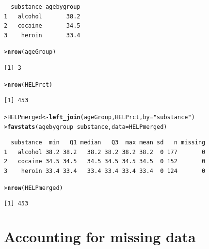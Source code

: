 \documentclass{tufte-book}\usepackage[]{graphicx}\usepackage[]{xcolor}
\makeatletter
\newcommand{\hlstr}[1]{\textcolor[rgb]{0.2,0.2,0.2}{#1}}%
\newcommand{\hlopt}[1]{\textcolor[rgb]{0.102,0.102,0.102}{#1}}%
\newcommand{\hlstd}[1]{\textcolor[rgb]{0.102,0.102,0.102}{#1}}%
\newcommand{\hlkwb}[1]{\textcolor[rgb]{0.102,0.102,0.102}{#1}}%
\newcommand{\hlkwc}[1]{\textcolor[rgb]{0.2,0.2,0.2}{#1}}%
\newcommand{\hlkwd}[1]{\textcolor[rgb]{0.102,0.102,0.102}{\textbf{#1}}}%
\newenvironment{kframe}{%
 \def\at@end@of@kframe{}%
 \ifinner\ifhmode%
  \def\at@end@of@kframe{\end{minipage}}%
  \begin{minipage}{\columnwidth}%
 \fi\fi%
 \def\FrameCommand##1{\hskip\@totalleftmargin \hskip-\fboxsep
 \colorbox{shadecolor}{##1}\hskip-\fboxsep
     \hskip-\linewidth \hskip-\@totalleftmargin \hskip\columnwidth}%
 \MakeFramed {\advance\hsize-\width
   \@totalleftmargin\z@ \linewidth\hsize
   \@setminipage}}%
 {\par\unskip\endMakeFramed%
 \at@end@of@kframe}
\newenvironment{knitrout}{}{} %
\makeatother
\begin{document}
\begin{knitrout}
\begin{kframe}
\begin{verbatim}
  substance agebygroup
1   alcohol       38.2
2   cocaine       34.5
3    heroin       33.4
\end{verbatim}
\begin{alltt}
\hlstd{> }\hlkwd{nrow}\hlstd{(ageGroup)}
\end{alltt}
\begin{verbatim}
[1] 3
\end{verbatim}
\begin{alltt}
\hlstd{> }\hlkwd{nrow}\hlstd{(HELPrct)}
\end{alltt}
\begin{verbatim}
[1] 453
\end{verbatim}
\begin{alltt}
\hlstd{> }\hlstd{HELPmerged} \hlkwb{<-} \hlkwd{left_join}\hlstd{(ageGroup, HELPrct,} \hlkwc{by}\hlstd{=}\hlstr{"substance"}\hlstd{)}
\hlstd{> }\hlkwd{favstats}\hlstd{(agebygroup} \hlopt{~} \hlstd{substance,} \hlkwc{data}\hlstd{=HELPmerged)}
\end{alltt}
\begin{verbatim}
  substance  min   Q1 median   Q3  max mean sd   n missing
1   alcohol 38.2 38.2   38.2 38.2 38.2 38.2  0 177       0
2   cocaine 34.5 34.5   34.5 34.5 34.5 34.5  0 152       0
3    heroin 33.4 33.4   33.4 33.4 33.4 33.4  0 124       0
\end{verbatim}
\begin{alltt}
\hlstd{> }\hlkwd{nrow}\hlstd{(HELPmerged)}
\end{alltt}
\begin{verbatim}
[1] 453
\end{verbatim}
\end{kframe}
\end{knitrout}


\section{Accounting for missing data}
\label{sec:miss}
\end{document}
